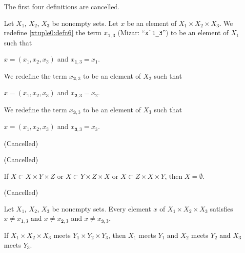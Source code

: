 \documentclass{article}
\begin{document}
The first four definitions are cancelled.

\begin{definition}
  Let $X_{1}$, $X_{2}$, $X_{3}$ be nonempty sets.
  Let $x$ be an element of $X_{1}\times X_{2}\times X_{3}$.
  We redefine \eqref{xtuple0:defn6} the term $x_{\mathbf{1},3}$ (Mizar: ``\verb#x`1_3#'') to be an element of
  $X_{1}$ such that
  \begin{defn}[start=5]
  \item $x=(x_{1},x_{2},x_{3})$ and $x_{\mathbf{1},3}=x_{1}$.
  \end{defn}
  We redefine the term $x_{\mathbf{2},3}$ to be an element of
  $X_{2}$ such that
  \begin{defn}
  \item $x=(x_{1},x_{2},x_{3})$ and $x_{\mathbf{2},3}=x_{2}$.
  \end{defn}
  We redefine the term $x_{\mathbf{3},3}$ to be an element of
  $X_{3}$ such that
  \begin{defn}
  \item $x=(x_{1},x_{2},x_{3})$ and $x_{\mathbf{3},3}=x_{3}$.
  \end{defn}
\end{definition}

\begin{thm}
\item\label{mcart1:43} (Cancelled)
\item\label{mcart1:44} (Cancelled)
\item\label{mcart1:45} If $X\subset X\times Y\times Z$ or
  $X\subset Y\times Z\times X$ or $X\subset Z\times X\times Y$,
  then $X=\emptyset$.
\item\label{mcart1:46} (Cancelled)
\item\label{mcart1:47} Let $X_{1}$, $X_{2}$, $X_{3}$ be nonempty sets.
  Every element $x$ of $X_{1}\times X_{2}\times X_{3}$ satisfies
  $x\neq x_{\mathbf{1},3}$ and $x\neq x_{\mathbf{2},3}$ and
  $x\neq x_{\mathbf{3},3}$.
\item\label{mcart1:48} If $X_{1}\times X_{2}\times X_{3}$ meets
  $Y_{1}\times Y_{2}\times Y_{3}$, then $X_{1}$ meets $Y_{1}$ and
  $X_{2}$ meets $Y_{2}$ and $X_{3}$ meets $Y_{3}$.
\end{thm}
\end{document}
